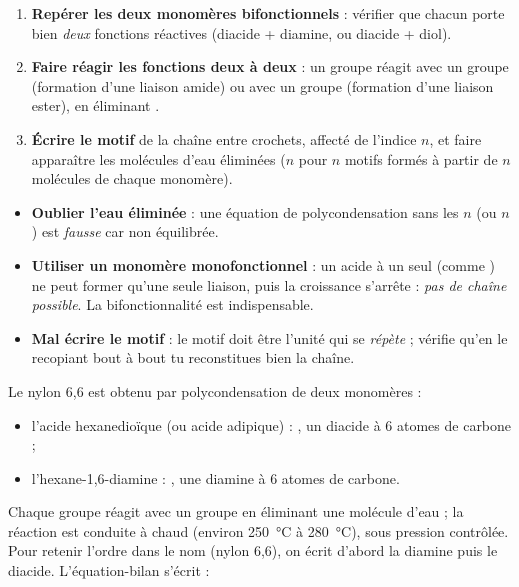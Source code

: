 \documentclass[11pt]{article}
\newcommand{\cle}[1]{{\popxbold\color{popdark}#1}}
\newcounter{popsec}
\newcounter{popsub}
\newcommand{\courssub}[1]{%
  \stepcounter{popsub}%
  \par\vspace{9pt}\noindent{\popxbold\fontsize{11.5}{13}\selectfont\color{popink}{\color{poporange}\thepopsec.\thepopsub}\hspace{6pt}#1}\par\nopagebreak\vspace{4pt}
}
\begin{document}
\begin{methode}
\begin{enumerate}
\item \textbf{Repérer les deux monomères bifonctionnels} : vérifier que chacun porte bien \emph{deux} fonctions réactives (diacide + diamine, ou diacide + diol).
\item \textbf{Faire réagir les fonctions deux à deux} : un groupe  réagit avec un groupe  (formation d'une liaison amide) ou avec un groupe  (formation d'une liaison ester), en éliminant .
\item \textbf{Écrire le motif} de la chaîne entre crochets, affecté de l'indice $n$, et faire apparaître les molécules d'eau éliminées ($n$  pour $n$ motifs formés à partir de $n$ molécules de chaque monomère).
\end{enumerate}
\end{methode}

\begin{attention}
\begin{itemize}
\item \textbf{Oublier l'eau éliminée} : une équation de polycondensation sans les $n$  (ou $n$ ) est \emph{fausse} car non équilibrée.
\item \textbf{Utiliser un monomère monofonctionnel} : un acide à un seul  (comme ) ne peut former qu'une seule liaison, puis la croissance s'arrête : \emph{pas de chaîne possible}. La bifonctionnalité est indispensable.
\item \textbf{Mal écrire le motif} : le motif doit être l'unité qui se \emph{répète} ; vérifie qu'en le recopiant bout à bout tu reconstitues bien la chaîne.
\end{itemize}
\end{attention}

\courssub{Le nylon 6,6 : un polyamide}

Le nylon 6,6 est obtenu par polycondensation de deux monomères :
\begin{itemize}
\item l'\cle{acide hexanedioïque} (ou acide adipique) : , un diacide à 6 atomes de carbone ;
\item l'\cle{hexane-1,6-diamine} : , une diamine à 6 atomes de carbone.
\end{itemize}

Chaque groupe  réagit avec un groupe  en éliminant une molécule d'eau ; la réaction est conduite à chaud (environ \SI{250}{\celsius} à \SI{280}{\celsius}), sous pression contrôlée. Pour retenir l'ordre dans le nom (nylon 6,6), on écrit d'abord la diamine puis le diacide. L'équation-bilan s'écrit :
\end{document}
